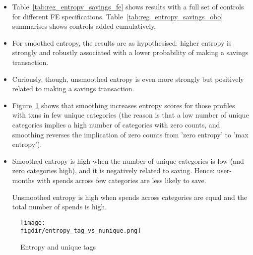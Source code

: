 \begin{itemize}

    \item Table~\ref{tab:reg_entropy_savings_fe} shows results with a full set
        of controls for different FE specifications.
        Table~\ref{tab:reg_entropy_savings_obo} summarises shows controls added
        cumulatively.

    \item For smoothed entropy, the results are as hypothesised: higher entropy
        is strongly and robustly associated with a lower probability of making
        a savings transaction.

    \item Curiously, though, unsmoothed entropy is even more strongly but
        positively related to making a savings transaction.

    \item Figure~\ref{fig:entropy_tag_vs_nunique} shows that smoothing
        increases entropy scores for those profiles with txns in few unique
        categories (the reason is that a low number of unique categories
        implies a high number of categories with zero counts, and smoothing
        reverses the implication of zero counts from 'zero entropy' to 'max
        entropy').

    \item Smoothed entropy is high when the number of unique categories is low
        (and zero categories high), and it is negatively related to saving.
        Hence: user-months with spends across few categories are less likely to
        save.

        Unsmoothed entropy is high when spends across categories are equal and
        the total number of spends is high.

\end{itemize}



\begin{landscape}
    
\end{landscape}

\begin{figure}[H]
    \caption{Entropy and unique tags}
    \label{fig:entropy_tag_vs_nunique}
    \begin{center}
        \texttt{[image: \\figdir/entropy\_tag\_vs\_nunique.png]}
    \end{center}
\end{figure}

